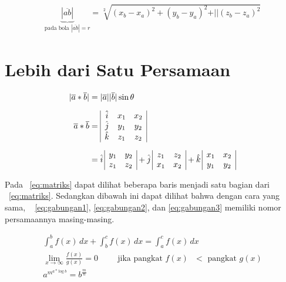\noindent \begin{align}\label{eq:bola}
    \underbrace{|\overline{ab}|}_{\text{pada bola $|\overline{ab}| = r$}} 
    = \sqrt[2]{(x_{b} - x_{a})^{2} + (y_{b} - y_{a})^{2} + 
        \vert\vert(z_{b} - z_{a})^{2}}
\end{align}

\section{Lebih dari Satu Persamaan}
\label{sec:multiEqu}
\noindent \begin{align}\label{eq:matriks}	
    |\overline{a} * \overline{b}| &= |\overline{a}| |\overline{b}| \sin\theta 
    \\[0.2cm]
    \overline{a} * \overline{b} &=  
    \begin{array}{| c c c |}
        \hat{i} & x_{1} & x_{2} \\
        \hat{j} & y_{1} & y_{2} \\
        \hat{k} & z_{1} & z_{2} \\
    \end{array} \nonumber \\[0.2cm]
    &= \hat{i} \,
    \begin{array}{ | c c | }
        y_{1} & y_{2} \\
        z_{1} & z_{2} \\
    \end{array} 
    + \hat{j} \,
    \begin{array}{ | c c | }
        z_{1} & z_{2} \\
        x_{1} & x_{2} \\
    \end{array} 
    + \hat{k} \,	
    \begin{array}{ | c c | }
        x_{1} & x_{2} \\
        y_{1} & y_{2} \\
    \end{array}
    \nonumber
\end{align}

Pada \equ~\ref{eq:matriks} dapat dilihat beberapa baris menjadi satu bagian 
dari \equ~\ref{eq:matriks}. 
Sedangkan dibawah ini dapat dilihat bahwa dengan cara yang sama, \equ~
\ref{eq:gabungan1}, \ref{eq:gabungan2}, dan \ref{eq:gabungan3} memiliki nomor 
persamaannya masing-masing. 

\noindent \begin{align}\label{eq:gabungan1}	
    \int_{a}^{b} f(x)\, dx + \int_{b}^{c} f(x) \, dx = \int_{a}^{c} f(x) \, dx
    \\\label{eq:gabungan2}
    \lim_{x \to \infty} \frac{f(x)}{g(x)} = 0 \hspace{1cm} 
    \text{jika pangkat $f(x)$ $<$ pangkat $g(x)$} \\\label{eq:gabungan3}
    a^{m^{a \, ^{n}\log b }} = b^{\frac{m}{n}}
\end{align}
\fi
